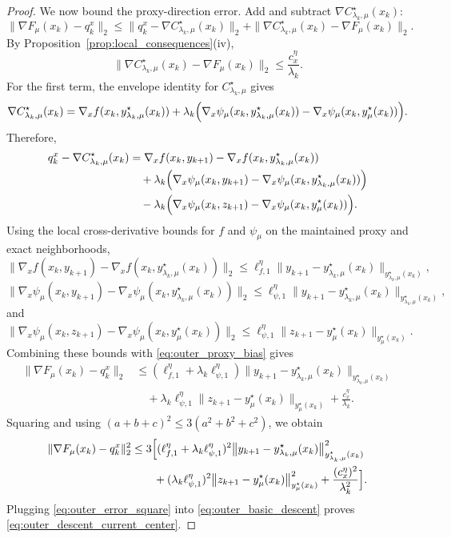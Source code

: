 \documentclass{article}
\begin{document}
\begin{proof}
We now bound the proxy-direction error. Add and subtract
\(\nabla C_{\lambda_k,\mu}^\star(x_k)\):
\[
\|\nabla F_\mu(x_k)-q_k^x\|_2
\le
\|q_k^x-\nabla C_{\lambda_k,\mu}^\star(x_k)\|_2
+
\|\nabla C_{\lambda_k,\mu}^\star(x_k)-\nabla F_\mu(x_k)\|_2 .
\]
By Proposition~\ref{prop:local_consequences}\textup{(iv)},
\begin{equation}
\label{eq:outer_proxy_bias}
\|\nabla C_{\lambda_k,\mu}^\star(x_k)-\nabla F_\mu(x_k)\|_2
\le
\frac{c_x^\eta}{\lambda_k}.
\end{equation}
For the first term, the envelope identity for \(C_{\lambda_k,\mu}^\star\) gives
\[
\nabla C_{\lambda_k,\mu}^\star(x_k)
=
\nabla_x f(x_k,y_{\lambda_k,\mu}^\star(x_k))
+
\lambda_k
\Bigl(
\nabla_x\psi_\mu(x_k,y_{\lambda_k,\mu}^\star(x_k))
-
\nabla_x\psi_\mu(x_k,y_\mu^\star(x_k))
\Bigr).
\]
Therefore,
\begin{align*}
q_k^x-\nabla C_{\lambda_k,\mu}^\star(x_k)
&=
\nabla_x f(x_k,y_{k+1})
-
\nabla_x f(x_k,y_{\lambda_k,\mu}^\star(x_k))
\\
&\quad
+
\lambda_k
\Bigl(
\nabla_x\psi_\mu(x_k,y_{k+1})
-
\nabla_x\psi_\mu(x_k,y_{\lambda_k,\mu}^\star(x_k))
\Bigr)
\\
&\quad
-
\lambda_k
\Bigl(
\nabla_x\psi_\mu(x_k,z_{k+1})
-
\nabla_x\psi_\mu(x_k,y_\mu^\star(x_k))
\Bigr).
\end{align*}
Using the local cross-derivative bounds for \(f\) and \(\psi_\mu\) on the maintained proxy and
exact neighborhoods,
\[
\|\nabla_x f(x_k,y_{k+1})
-
\nabla_x f(x_k,y_{\lambda_k,\mu}^\star(x_k))\|_2
\le
\ell_{f,1}^\eta
\big\|y_{k+1}-y_{\lambda_k,\mu}^\star(x_k)\big\|_{y_{\lambda_k,\mu}^\star(x_k)},
\]
\[
\|\nabla_x\psi_\mu(x_k,y_{k+1})
-
\nabla_x\psi_\mu(x_k,y_{\lambda_k,\mu}^\star(x_k))\|_2
\le
\ell_{\psi,1}^\eta
\big\|y_{k+1}-y_{\lambda_k,\mu}^\star(x_k)\big\|_{y_{\lambda_k,\mu}^\star(x_k)},
\]
and
\[
\|\nabla_x\psi_\mu(x_k,z_{k+1})
-
\nabla_x\psi_\mu(x_k,y_\mu^\star(x_k))\|_2
\le
\ell_{\psi,1}^\eta
\big\|z_{k+1}-y_\mu^\star(x_k)\big\|_{y_\mu^\star(x_k)}.
\]
Combining these bounds with \eqref{eq:outer_proxy_bias} gives
\begin{align*}
\|\nabla F_\mu(x_k)-q_k^x\|_2
&\le
(\ell_{f,1}^\eta+\lambda_k\ell_{\psi,1}^\eta)
\big\|y_{k+1}-y_{\lambda_k,\mu}^\star(x_k)\big\|_{y_{\lambda_k,\mu}^\star(x_k)}
\\
&\quad
+
\lambda_k\ell_{\psi,1}^\eta
\big\|z_{k+1}-y_\mu^\star(x_k)\big\|_{y_\mu^\star(x_k)}
+
\frac{c_x^\eta}{\lambda_k}.
\end{align*}
Squaring and using \((a+b+c)^2\le 3(a^2+b^2+c^2)\), we obtain
\begin{align}
\|\nabla F_\mu(x_k)-q_k^x\|_2^2
&\le
3\Bigl[
(\ell_{f,1}^\eta+\lambda_k\ell_{\psi,1}^\eta)^2
\big\|y_{k+1}-y_{\lambda_k,\mu}^\star(x_k)\big\|_{y_{\lambda_k,\mu}^\star(x_k)}^2
\notag\\
&\qquad
+
(\lambda_k\ell_{\psi,1}^\eta)^2
\big\|z_{k+1}-y_\mu^\star(x_k)\big\|_{y_\mu^\star(x_k)}^2
+
\frac{(c_x^\eta)^2}{\lambda_k^2}
\Bigr].
\label{eq:outer_error_square}
\end{align}
Plugging \eqref{eq:outer_error_square} into \eqref{eq:outer_basic_descent} proves
\eqref{eq:outer_descent_current_center}.


\end{proof}
\end{document}
